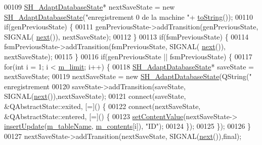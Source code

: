 \begin{DoxyCode}
00109                 \hyperlink{classSH__AdaptDatabaseState}{SH\_AdaptDatabaseState}* nextSaveState = \textcolor{keyword}{new} 
      \hyperlink{classSH__AdaptDatabaseState}{SH\_AdaptDatabaseState}(\textcolor{stringliteral}{"enregistrement 0 de la machine "}+
      \hyperlink{classSH__GenericStateMachine_a85c0c1c9d258ae991f84667412fa47cd}{toString}());
00110                 \textcolor{keywordflow}{if}(genPreviousState) \{
00111                     genPreviousState->addTransition(genPreviousState, SIGNAL(
      \hyperlink{classSH__GenericStateMachine_af4771d31d87951c997fba1633c2d67f6}{next}()), nextSaveState);
00112                 \}
00113                 \textcolor{keywordflow}{if}(fsmPreviousState) \{
00114                     fsmPreviousState->addTransition(fsmPreviousState, SIGNAL(
      \hyperlink{classSH__GenericStateMachine_af4771d31d87951c997fba1633c2d67f6}{next}()), nextSaveState);
00115                 \}
00116                 \textcolor{keywordflow}{if}(genPreviousState || fsmPreviousState) \{
00117                     \textcolor{keywordflow}{for}(\textcolor{keywordtype}{int} i = 1; i < \hyperlink{classSH__LoopingInOutStateMachine_a818a60d3691fcac11323ad114c309dcb}{m\_limit}; i++) \{
00118                         \hyperlink{classSH__AdaptDatabaseState}{SH\_AdaptDatabaseState}* saveState = nextSaveState;
00119                         nextSaveState = \textcolor{keyword}{new} \hyperlink{classSH__AdaptDatabaseState}{SH\_AdaptDatabaseState}(QString(\textcolor{stringliteral}{"
      enregistrement %
00120                         saveState->addTransition(saveState, SIGNAL(\hyperlink{classSH__GenericStateMachine_af4771d31d87951c997fba1633c2d67f6}{next}()),nextSaveState);
00121                         connect(saveState, &QAbstractState::exited, [=]() \{
00122                             connect(nextSaveState, &QAbstractState::entered, [=]() \{
00123                                 \hyperlink{classSH__InOutStateMachine_a9ab1534306b2bdb62743d4bcefe40c17}{setContentValue}(nextSaveState->
      \hyperlink{classSH__AdaptDatabaseState_a037db544ea05f42d21fcbdda758839fe}{insertUpdate}(\hyperlink{classSH__InOutStateMachine_aa009eecc5ab6181358faafb5996b6006}{m\_tableName}, \hyperlink{classSH__LoopingInOutStateMachine_a145e625dcb4d5438bd9c761eeb9425d4}{m\_contents}[i]), \textcolor{stringliteral}{"ID"});
00124                             \});
00125                         \});
00126                     \}
00127                     nextSaveState->addTransition(nextSaveState, SIGNAL(\hyperlink{classSH__GenericStateMachine_af4771d31d87951c997fba1633c2d67f6}{next}()),\textcolor{keyword}{final});
}
\end{DoxyCode}
